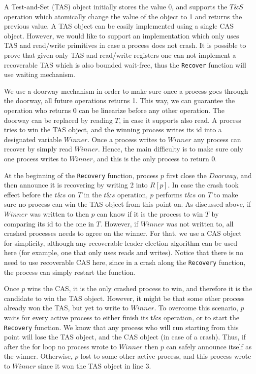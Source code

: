 A Test-and-Set (TAS) object initially stores the value 0, and supports the $T\&S$ operation which atomically change the value of the object to 1 and returns the previous value. A TAS object can be easily implemented using a single CAS object. However, we would like to support an implementation which only uses TAS and read/write primitives in case a process does not crash. It is possible to prove that given only TAS and read/write registers one can not implement a recoverable TAS which is also bounded wait-free, thus the \texttt{Recover} function will use waiting mechanism.

We use a doorway mechanism in order to make sure once a process goes through the doorway, all future operations returns 1. This way, we can guarantee the operation who returns 0 can be linearize before any other operation. The doorway can be replaced by reading $T$, in case it supports also read.
A process tries to win the TAS object, and the winning process writes its id into a designated variable $Winner$. Once a process writes to $Winner$ any process can recover by simply read $Winner$. Hence, the main difficulty is to make sure only one process writes to $Winner$, and this is the only process to return 0.

At the beginning of the \texttt{Recovery} function, process $p$ first close the $Doorway$, and then announce it is recovering by writing 2 into $R[p]$. In case the crash took effect before the $t\&s$ on $T$ in the $t\&s$ operation, $p$ performs $t\&s$ on $T$ to make sure no process can win the TAS object from this point on. As discussed above, if $Winner$ was written to then $p$ can know if it is the process to win $T$ by comparing its id to the one in $T$. However, if $Winner$ was not written to, all crashed processes needs to agree on the winner. For that, we use a CAS object for simplicity, although any recoverable leader election algorithm can be used here (for example, one that only uses reads and writes). Notice that there is no need to use recoverable CAS here, since in a crash along the \texttt{Recovery} function, the process can simply restart the function.

Once $p$ wins the CAS, it is the only crashed process to win, and therefore it is the candidate to win the TAS object. However, it might be that some other process already won the TAS, but yet to write to $Winner$. To overcome this scenario, $p$ waits for every active process to either finish its t\&s operation, or to start the \texttt{Recovery} function. We know that any process who will run starting from this point will lose the TAS object, and the CAS object (in case of a crash). Thus, if after the for loop no process wrote to $Winner$ then $p$ can safely announce itself as the winner. Otherwise, $p$ lost to some other active process, and this process wrote to $Winner$ since it won the TAS object in line 3.


